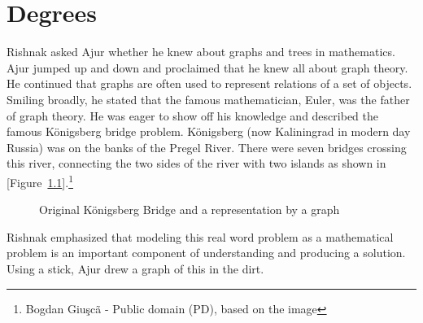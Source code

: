 \chapter{Degrees}
Rishnak asked Ajur whether he knew about graphs and trees in mathematics. Ajur jumped up and down and proclaimed that he knew all about graph theory. He continued that graphs are often used to represent relations of a set of objects. Smiling broadly, he stated that the famous mathematician, Euler, was the father of graph theory. He was eager to show off his knowledge and described the famous  K\"{o}nigsberg bridge  problem. K\"{o}nigsberg  (now Kaliningrad in modern day Russia) was on the banks of the Pregel River.
There were  seven bridges crossing this river, connecting the two sides of the river with two islands as shown in  [Figure~\ref{kon0}].\footnote{Bogdan Giu\c{s}c\~{a} - Public domain (PD), based on the image}
\begin{figure}%
    \centering
    \qquad
    \caption{Original K\"{o}nigsberg Bridge and a representation by a graph}%
    \label{kon0}%
\end{figure}
%
Rishnak emphasized that modeling this real word problem as a mathematical problem is an important component of understanding and
producing a solution.
Using a stick, Ajur drew a graph of this in the dirt.

